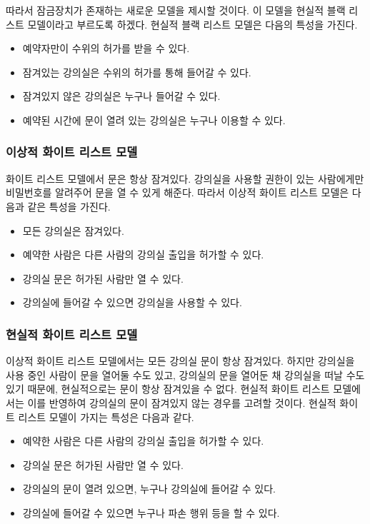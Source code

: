 \documentclass[11pt,a4paper]{article}
\begin{document}
따라서 잠금장치가 존재하는 새로운 모델을 제시할 것이다. 이 모델을 현실적 블랙
리스트 모델이라고 부르도록 하겠다. 현실적 블랙 리스트 모델은 다음의 특성을
가진다.
\begin{itemize}
\item 예약자만이 수위의 허가를 받을 수 있다.
\item 잠겨있는 강의실은 수위의 허가를 통해 들어갈 수 있다.
\item 잠겨있지 않은 강의실은 누구나 들어갈 수 있다.
\item 예약된 시간에 문이 열려 있는 강의실은 누구나 이용할 수 있다.
\end{itemize}

\subsubsection{이상적 화이트 리스트 모델}
화이트 리스트 모델에서 문은 항상 잠겨있다. 강의실을 사용할 권한이 있는
사람에게만 비밀번호를 알려주어 문을 열 수 있게 해준다. 따라서 이상적 화이트
리스트 모델은 다음과 같은 특성을 가진다.
\begin{itemize}
\item 모든 강의실은 잠겨있다.
\item 예약한 사람은 다른 사람의 강의실 출입을 허가할 수 있다.
\item 강의실 문은 허가된 사람만 열 수 있다.
\item 강의실에 들어갈 수 있으면 강의실을 사용할 수 있다.
\end{itemize}

\subsubsection{현실적 화이트 리스트 모델}
이상적 화이트 리스트 모델에서는 모든 강의실 문이 항상 잠겨있다. 하지만
강의실을 사용 중인 사람이 문을 열어둘 수도 있고, 강의실의 문을 열어둔 채
강의실을 떠날 수도 있기 때문에, 현실적으로는 문이 항상 잠겨있을 수 없다.
현실적 화이트 리스트 모델에서는 이를 반영하여 강의실의 문이 잠겨있지 않는
경우를 고려할 것이다. 현실적 화이트 리스트 모델이 가지는 특성은 다음과 같다.
\begin{itemize}
\item 예약한 사람은 다른 사람의 강의실 출입을 허가할 수 있다.
\item 강의실 문은 허가된 사람만 열 수 있다.
\item 강의실의 문이 열려 있으면, 누구나 강의실에 들어갈 수 있다.
\item 강의실에 들어갈 수 있으면 누구나 파손 행위 등을 할 수 있다.
\end{itemize}
\end{document}
